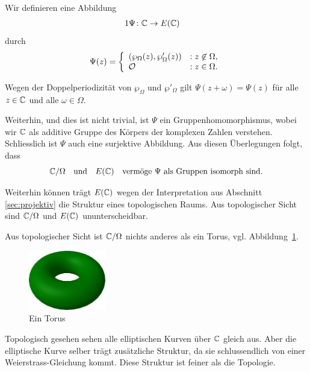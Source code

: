 Wir definieren eine Abbildung
\begin{alignat*}1
  \Psi \colon &\IC\rightarrow E(\IC)
\end{alignat*}
durch
\begin{equation*}
  \Psi(z) = \left\{
    \begin{array}{ll}
      (\wp_\Omega(z),\wp'_\Omega(z)) &: z\not\in\Omega, \\
      {\mathcal O} &:z\in \Omega.
    \end{array}\right.
\end{equation*}

Wegen der Doppelperiodizität von $\wp_\Omega$ und $\wp'_\Omega$
gilt $\Psi(z+\omega) = \Psi(z)$ für alle $z\in{\mathbb{C}}$ und alle
$\omega\in\Omega$.

Weiterhin, und dies ist nicht trivial, ist $\Psi$ ein
Gruppenhomomorphismus, wobei wir ${\mathbb{C}}$ als additive Gruppe des Körpers
der komplexen Zahlen verstehen. Schliesslich ist $\Psi$ auch eine
surjektive Abbildung. Aus diesen Überlegungen folgt, dass
\begin{equation*}
  {\mathbb{C}}/\Omega \quad\text{und}\quad E({\mathbb{C}})\quad\text{vermöge $\Psi$ als Gruppen isomorph sind.}
\end{equation*}

Weiterhin können trägt $E({\mathbb{C}})$ wegen der Interpretation aus Abschnitt
\ref{sec:projektiv} die Struktur eines topologischen Raums.
Aus
topologischer Sicht sind ${\mathbb{C}}/\Omega$ und $E({\mathbb{C}})$ ununterscheidbar.

\begin{bemerkung}
  Aus topologischer Sicht ist ${\mathbb{C}}/\Omega$ nichts anderes als ein
  Torus, vgl. Abbildung~\ref{fig:torus}.
    \begin{figure}
      \centering
      \caption{Ein Torus}
    \label{fig:torus}
    \includegraphics[width=0.3\textwidth]{./plots/torus.png}
  \end{figure}
  Topologisch gesehen sehen alle elliptischen Kurven über ${\mathbb{C}}$ gleich
  aus. Aber die elliptische Kurve selber trägt zusätzliche Struktur,
  da sie schlussendlich von einer Weierstrass-Gleichung kommt. Diese
  Struktur ist feiner als die Topologie.
\end{bemerkung}

